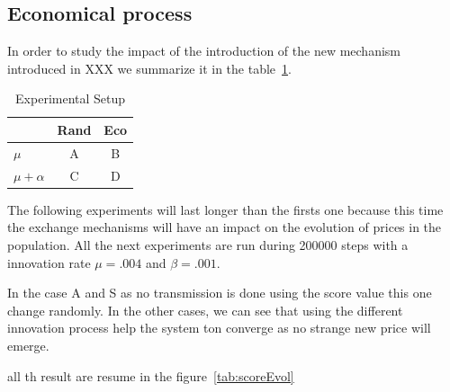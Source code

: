 \documentclass{wscpaperproc}
\begin{document}
\subsection{ Economical  process}

In order to study the impact of the introduction of the new mechanism  introduced in XXX we summarize it in the table~\ref{tab:exp}. 
\begin{table}
	\centering
	\begin{tabular}{l|c|c}
		& Rand & Eco \\\hline
		$\mu$ &A & B \\
		$\mu +\alpha$ & C & D \\
	\end{tabular}
	\caption{Experimental Setup}
	\label{tab:exp}
\end{table}


The following  experiments will last longer than the firsts one because this time the exchange mechanisms will have an impact on the evolution of prices in the population. All the next experiments are run during 200000 steps with a innovation rate $\mu=.004$ and $\beta=.001$.

In the case A and S as no transmission is done using the score value this one change randomly. In the other cases, we can see that using the different innovation process help the system ton converge as no strange new price will emerge.

all th result are resume in the figure~\ref{tab:scoreEvol}
\end{document}
